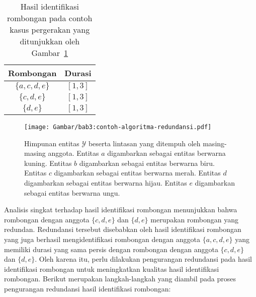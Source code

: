 \begin{table}[h]
    \centering
    \captionsetup{width=0.6\textwidth}
    \caption{Hasil identifikasi rombongan pada contoh kasus pergerakan yang ditunjukkan oleh Gambar~\ref{bab3:contoh-algoritma-redundansi}}
    \begin{tabular}{|c|c|}
        \hline
        Rombongan & Durasi \\
        \hline
        $\{ a, c, d, e \}$ & $[1, 3]$ \\
        $\{ c, d, e \}$ & $[1, 3]$ \\
        $\{ d, e \}$ & $[1, 3]$ \\
        \hline
    \end{tabular}
    \label{bab6:contoh-identifikasi-redundan}
\end{table}

\begin{figure}[t]
    \centering
    \captionsetup{width=0.7\textwidth}
    \texttt{[image: Gambar/bab3:contoh-algoritma-redundansi.pdf]}
    \caption[Contoh proses algoritma pengurangan redundansi]{Himpunan entitas $\mathcal{Y}$ beserta lintasan yang ditempuh oleh masing-masing anggota. Entitas $a$ digambarkan sebagai entitas berwarna kuning. Entitas $b$ digambarkan sebagai entitas berwarna biru. Entitas $c$ digambarkan sebagai entitas berwarna merah. Entitas $d$ digambarkan sebagai entitas berwarna hijau. Entitas $e$ digambarkan sebagai entitas berwarna ungu.}
    \label{bab3:contoh-algoritma-redundansi}
\end{figure}

Analisis singkat terhadap hasil identifikasi rombongan menunjukkan bahwa rombongan dengan anggota $\{ c, d, e \}$ dan $\{ d, e \}$ merupakan rombongan yang redundan. Redundansi tersebut disebabkan oleh hasil identifikasi rombongan yang juga berhasil mengidentifikasi rombongan dengan anggota $\{ a, c, d, e \}$ yang memiliki durasi yang sama persis dengan rombongan dengan anggota $\{ c, d, e \}$ dan $\{ d, e \}$. Oleh karena itu, perlu dilakukan pengurangan redundansi pada hasil identifikasi rombongan untuk meningkatkan kualitas hasil identifikasi rombongan. Berikut merupakan langkah-langkah yang diambil pada proses pengurangan redundansi hasil identifikasi rombongan:

